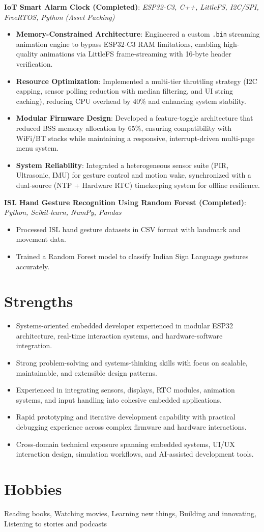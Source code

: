 \documentclass[a4paper,10pt]{article}
\begin{document}
\textbf{IoT Smart Alarm Clock (Completed)}:
\textit{ESP32-C3, C++, LittleFS, I2C/SPI, FreeRTOS, Python (Asset Packing)}  
\begin{itemize}
    \item \textbf{Memory-Constrained Architecture}: Engineered a custom \texttt{.bin} streaming animation engine to bypass ESP32-C3 RAM limitations, enabling high-quality animations via LittleFS frame-streaming with 16-byte header verification.
    \item \textbf{Resource Optimization}: Implemented a multi-tier throttling strategy (I2C capping, sensor polling reduction with median filtering, and UI string caching), reducing CPU overhead by 40\% and enhancing system stability.
    \item \textbf{Modular Firmware Design}: Developed a feature-toggle architecture that reduced BSS memory allocation by 65\%, ensuring compatibility with WiFi/BT stacks while maintaining a responsive, interrupt-driven multi-page menu system.
    \item \textbf{System Reliability}: Integrated a heterogeneous sensor suite (PIR, Ultrasonic, IMU) for gesture control and motion wake, synchronized with a dual-source (NTP + Hardware RTC) timekeeping system for offline resilience.
\end{itemize}

\textbf{ISL Hand Gesture Recognition Using Random Forest (Completed)}:
\textit{Python, Scikit-learn, NumPy, Pandas}  
\begin{itemize}
    \item Processed ISL hand gesture datasets in CSV format with landmark and movement data.
    \item Trained a Random Forest model to classify Indian Sign Language gestures accurately.
\end{itemize}

\section*{Strengths}
\begin{itemize}
    \item Systems-oriented embedded developer experienced in modular ESP32 architecture, real-time interaction systems, and hardware-software integration.
    \item Strong problem-solving and systems-thinking skills with focus on scalable, maintainable, and extensible design patterns.
    \item Experienced in integrating sensors, displays, RTC modules, animation systems, and input handling into cohesive embedded applications.
    \item Rapid prototyping and iterative development capability with practical debugging experience across complex firmware and hardware interactions.
    \item Cross-domain technical exposure spanning embedded systems, UI/UX interaction design, simulation workflows, and AI-assisted development tools.
\end{itemize}

\section*{Hobbies}
Reading books, Watching movies, Learning new things, Building and innovating, Listening to stories and podcasts
\end{document}
